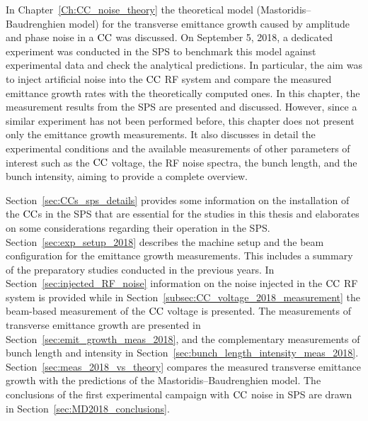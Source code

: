 In Chapter~\ref{Ch:CC_noise_theory} the theoretical model (Mastoridis--Baudrenghien model) for the transverse emittance growth caused by amplitude and phase noise in a ${\mathrm{CC}}$ was discussed. On September 5, 2018, a dedicated experiment was conducted in the SPS to benchmark this model against experimental data and check the analytical predictions. In particular, the aim was to inject artificial noise into the ${\mathrm{CC}}$ RF system and compare the measured emittance growth rates with the theoretically computed ones. In this chapter, the measurement results from the SPS are presented and discussed. However, since a similar experiment has not been performed before, this chapter does not present only the emittance growth measurements. It also discusses in detail the experimental conditions and the available measurements of other parameters of interest such as the ${\mathrm{CC}}$ voltage, the RF noise spectra, the bunch length, and the bunch intensity, aiming to provide a complete overview.


Section~\ref{sec:CCs_sps_details} provides some information on the installation of the ${\mathrm{CC}}$s in the SPS that are essential for the studies in this thesis and elaborates on some considerations regarding their operation in the SPS. Section~\ref{sec:exp_setup_2018} describes the machine setup and the beam configuration for the emittance growth measurements. This includes a summary of the preparatory studies conducted in the previous years. In Section~\ref{sec:injected_RF_noise} information on the noise injected in the ${\mathrm{CC}}$ RF system is provided while in Section~\ref{subsec:CC_voltage_2018_measurement} the beam-based measurement of the ${\mathrm{CC}}$ voltage is presented. The measurements of transverse emittance growth are presented in Section~\ref{sec:emit_growth_meas_2018}, and the complementary measurements of bunch length and intensity in Section~\ref{sec:bunch_length_intensity_meas_2018}. Section~\ref{sec:meas_2018_vs_theory} compares the measured transverse emittance growth with the predictions of the Mastoridis--Baudrenghien model. The conclusions of the first experimental campaign with ${\mathrm{CC}}$ noise in SPS are drawn in Section~\ref{sec:MD2018_conclusions}.

